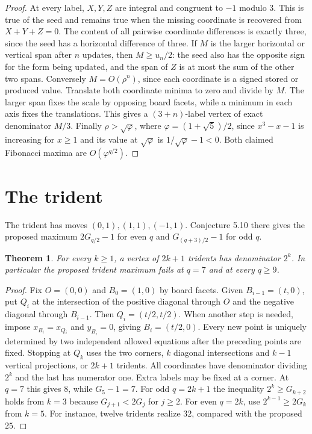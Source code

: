 \documentclass[11pt]{article}
\newtheorem{theorem}{Theorem}
\begin{document}
\begin{proof}
At every label, $X,Y,Z$ are integral and congruent to $-1$ modulo $3$. This is true of the seed and remains true when the missing coordinate is recovered from $X+Y+Z=0$. The content of all pairwise coordinate differences is exactly three, since the seed has a horizontal difference of three. If $M$ is the larger horizontal or vertical span after $n$ updates, then $M\ge u_n/2$: the seed also has the opposite sign for the form being updated, and the span of $Z$ is at most the sum of the other two spans. Conversely $M=O(\rho^n)$, since each coordinate is a signed stored or produced value. Translate both coordinate minima to zero and divide by $M$. The larger span fixes the scale by opposing board facets, while a minimum in each axis fixes the translations. This gives a $(3+n)$-label vertex of exact denominator $M/3$. Finally $\rho>\sqrt\varphi$, where $\varphi=(1+\sqrt5)/2$, since $x^3-x-1$ is increasing for $x\ge1$ and its value at $\sqrt\varphi$ is $1/\sqrt\varphi-1<0$. Both claimed Fibonacci maxima are $O(\varphi^{q/2})$.
\end{proof}

\section{The trident}
The trident has moves $(0,1),(1,1),(-1,1)$. Conjecture 5.10 there gives the proposed maximum $2G_{q/2}-1$ for even $q$ and $G_{(q+3)/2}-1$ for odd $q$.
\begin{theorem}\label{t:trident}
For every $k\ge1$, a vertex of $2k+1$ tridents has denominator $2^k$. In particular the proposed trident maximum fails at $q=7$ and at every $q\ge9$.
\end{theorem}
\begin{proof}
Fix $O=(0,0)$ and $B_0=(1,0)$ by board facets. Given $B_{i-1}=(t,0)$, put $Q_i$ at the intersection of the positive diagonal through $O$ and the negative diagonal through $B_{i-1}$. Then $Q_i=(t/2,t/2)$. When another step is needed, impose $x_{B_i}=x_{Q_i}$ and $y_{B_i}=0$, giving $B_i=(t/2,0)$. Every new point is uniquely determined by two independent allowed equations after the preceding points are fixed. Stopping at $Q_k$ uses the two corners, $k$ diagonal intersections and $k-1$ vertical projections, or $2k+1$ tridents. All coordinates have denominator dividing $2^k$ and the last has numerator one. Extra labels may be fixed at a corner. At $q=7$ this gives $8$, while $G_5-1=7$. For odd $q=2k+1$ the inequality $2^k\ge G_{k+2}$ holds from $k=3$ because $G_{j+1}<2G_j$ for $j\ge2$. For even $q=2k$, use $2^{k-1}\ge2G_k$ from $k=5$. For instance, twelve tridents realize $32$, compared with the proposed $25$.
\end{proof}
\end{document}

